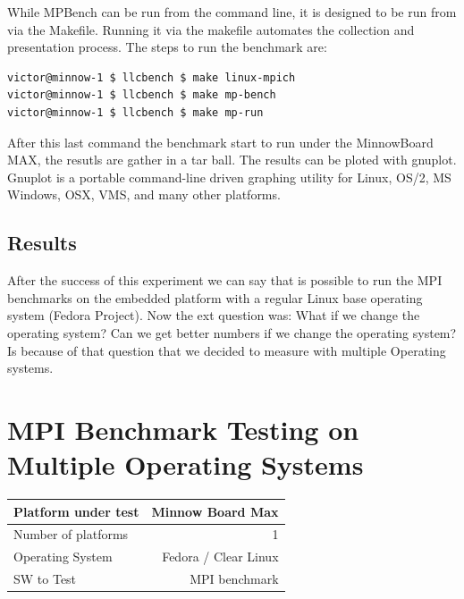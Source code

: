 While MPBench can be run from the command line, it is designed to be run from
via the Makefile. Running it via the makefile automates the collection and
presentation process. The steps to run the benchmark are: 

\begin{minipage}{\textwidth}
\end{minipage}

\begin{minipage}{\textwidth}
\begin{lstlisting}[frame=single]
victor@minnow-1 $ llcbench $ make linux-mpich
victor@minnow-1 $ llcbench $ make mp-bench
victor@minnow-1 $ llcbench $ make mp-run
\end{lstlisting}
\end{minipage}

After this last command the benchmark start to run under the MinnowBoard MAX, the
resutls are gather in a tar ball. The results can be ploted with gnuplot.
Gnuplot is a portable command-line driven graphing utility for Linux, OS/2, MS
Windows, OSX, VMS, and many other platforms. 

\subsection{Results}
After the success of this experiment we can say that is possible to run the MPI
benchmarks on the embedded platform with a regular Linux base operating system
(Fedora Project). Now the ext question was: What if we change the operating
system? Can we get better numbers if we change the operating system? Is because
of that question that we decided to measure with multiple Operating systems.


\section{MPI Benchmark Testing on Multiple Operating Systems}

    \begin{center}
    \begin{tabular}{ | l | r |}
        \hline
        Platform under test & Minnow Board  Max \\ \hline
        Number of platforms  & 1  \\ \hline
        Operating System & Fedora / Clear Linux  \\ \hline
        SW to Test & MPI benchmark \\ \hline
    \end{tabular}
    \end{center}


